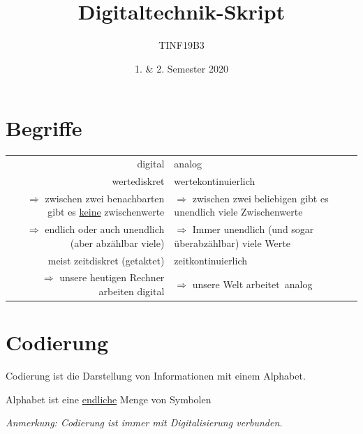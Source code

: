 \documentclass[10pt,a4paper]{scrartcl}
\author{TINF19B3}
\date{1. \& 2. Semester 2020}
\title{Digitaltechnik-Skript}
\begin{document}
\restoregeometry %
\nopagecolor%


	\newpage
	\tableofcontents
	\newpage
	\section{Begriffe}
	\begin{tabular}{r|l}
		digital & analog \\
		wertediskret & wertekontinuierlich\\
		$\Rightarrow$ zwischen zwei benachbarten gibt es \underline{keine} zwischenwerte & $\Rightarrow$ zwischen zwei beliebigen gibt es unendlich viele Zwischenwerte \\
		$ \Rightarrow $ endlich oder auch unendlich (aber abzählbar viele) & $ \Rightarrow $ Immer unendlich (und sogar überabzählbar) viele Werte \\
		meist zeitdiskret (\glqq getaktet\grqq) & zeitkontinuierlich \\
		$ \Rightarrow $ unsere heutigen Rechner arbeiten digital & $ \Rightarrow $ unsere Welt \glqq arbeitet\grqq\ analog
	\end{tabular}

\section{Codierung}

	\begin{Theorem}{}{}
		Codierung ist die Darstellung von Informationen mit einem \glqq Alphabet\grqq.
	\end{Theorem}
		
	\begin{Theorem}{}{}
		Alphabet ist eine \underline{endliche} Menge von Symbolen
	\end{Theorem}
	
	\textit{Anmerkung: Codierung ist immer mit Digitalisierung verbunden.} \\
	
\end{document}
